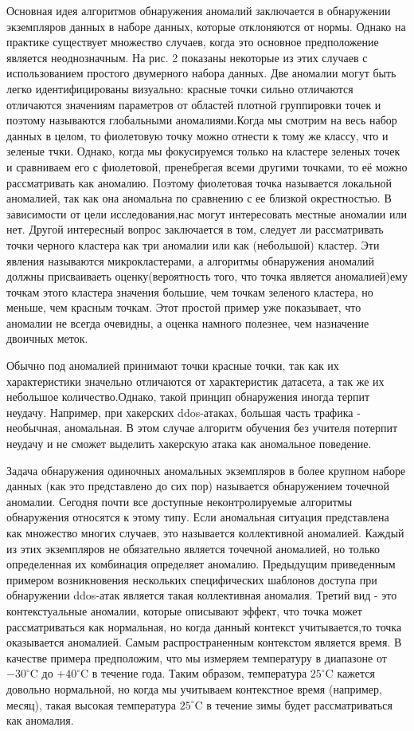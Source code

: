 Основная идея алгоритмов обнаружения аномалий заключается в обнаружении экземпляров данных в наборе данных, которые отклоняются от нормы. Однако на практике существует множество случаев, когда это основное предположение является неоднозначным. На рис. 2 показаны некоторые из этих случаев с использованием простого двумерного набора данных. Две аномалии могут быть легко идентифицированы визуально: красные точки  сильно отличаются отличаются значениям параметров от областей плотной группировки точек  и поэтому называются глобальными аномалиями.Когда мы смотрим на весь набор данных в целом, то фиолетовую точку можно отнести к тому же классу, что и зеленые тчки.  Однако, когда мы фокусируемся только на кластере зеленых точек и сравниваем его с фиолетовой, пренебрегая всеми другими точками, то её можно рассматривать как аномалию. Поэтому фиолетовая точка называется локальной аномалией, так как она аномальна по сравнению с ее близкой окрестностью. В зависимости от цели исследования,нас могут интересовать   местные аномалии или нет. Другой интересный вопрос заключается в том, следует ли рассматривать точки черного кластера  как три аномалии или как (небольшой) кластер. Эти явления называются микрокластерами, а алгоритмы обнаружения аномалий должны присваиваеть  оценку(вероятность того, что точка является аномалией)ему точкам этого кластера значения большие, чем точкам зеленого кластера, но меньше, чем красным точкам. Этот простой пример уже показывает, что аномалии не всегда очевидны, а оценка намного полезнее, чем назначение двоичных меток.

Обычно под аномалией принимают точки красные точки, так как их характеристики значельно отличаются от характеристик датасета, а так же их небольшое количество.Однако, такой принцип обнаружения иногда терпит неудачу. Например, при хакерских ddos-атаках, большая часть трафика - необычная, аномальная. В этом случае алгоритм обучения без учителя потерпит неудачу и не сможет выделить хакерскую атака как аномальное поведение.

Задача обнаружения одиночных аномальных экземпляров в более крупном наборе данных (как это представлено до сих пор) называется обнаружением точечной аномалии\cite{Book04}. Сегодня почти все доступные неконтролируемые алгоритмы обнаружения  относятся к этому типу. Если аномальная ситуация представлена ​​как множество многих случаев, это называется коллективной аномалией. Каждый из этих экземпляров не обязательно является точечной аномалией, но только определенная их комбинация определяет аномалию. Предыдущим приведенным примером возникновения нескольких специфических шаблонов доступа при обнаружении ddos-атак является такая коллективная аномалия. Третий вид - это контекстуальные аномалии, которые описывают эффект, что точка может рассматриваться как нормальная, но когда данный контекст учитывается,то точка оказывается аномалией. Самым распространенным контекстом является время. В качестве примера предположим, что мы измеряем температуру в диапазоне от $-30^{\circ}$C до $+40^{\circ}$C в течение года. Таким образом, температура $25^{\circ}$C кажется довольно нормальной, но когда мы учитываем контекстное время (например, месяц), такая высокая температура $25^{\circ}$C  в течение зимы  будет рассматриваться как аномалия.

